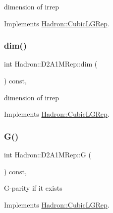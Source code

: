 dimension of irrep 

Implements \mbox{\hyperlink{structHadron_1_1CubicLGRep_a3acbaea26503ed64f20df693a48e4cdd}{Hadron\+::\+Cubic\+L\+G\+Rep}}.

\mbox{\label{structHadron_1_1D2A1MRep_a2a6e259c17f5c9b6c35271b8b25ecfab}} 
\subsubsection{\texorpdfstring{dim()}{dim()}\hspace{0.1cm}{\footnotesize\ttfamily [3/3]}}
{\footnotesize\ttfamily int Hadron\+::\+D2\+A1\+M\+Rep\+::dim (\begin{DoxyParamCaption}{ }\end{DoxyParamCaption}) const\hspace{0.3cm}{\ttfamily [inline]}, {\ttfamily [virtual]}}

dimension of irrep 

Implements \mbox{\hyperlink{structHadron_1_1CubicLGRep_a3acbaea26503ed64f20df693a48e4cdd}{Hadron\+::\+Cubic\+L\+G\+Rep}}.

\mbox{\label{structHadron_1_1D2A1MRep_a0778e49dc6d5a6cfa12f824a75b23b4b}} 
\subsubsection{\texorpdfstring{G()}{G()}\hspace{0.1cm}{\footnotesize\ttfamily [1/3]}}
{\footnotesize\ttfamily int Hadron\+::\+D2\+A1\+M\+Rep\+::G (\begin{DoxyParamCaption}{ }\end{DoxyParamCaption}) const\hspace{0.3cm}{\ttfamily [inline]}, {\ttfamily [virtual]}}

G-\/parity if it exists 

Implements \mbox{\hyperlink{structHadron_1_1CubicLGRep_ace26f7b2d55e3a668a14cb9026da5231}{Hadron\+::\+Cubic\+L\+G\+Rep}}.

\mbox{\label{structHadron_1_1D2A1MRep_a0778e49dc6d5a6cfa12f824a75b23b4b}} 
